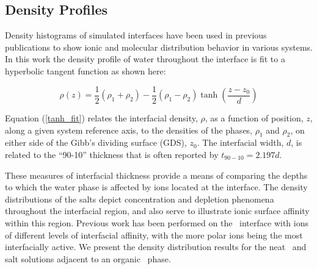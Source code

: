 \subsection{Density Profiles}

Density histograms of simulated interfaces have been used in previous publications to show ionic and molecular distribution behavior in various systems.\cite{Chang1995,Eggimann2008,Du2008,Wick2006c,Petersen2005a,Hore2008,Walker2006b,Walker2007b} In this work the density profile of water throughout the interface is fit to a hyperbolic tangent function\cite{Wick2006c,MATSUMOTO1988} as shown here:

\begin{equation}\label{tanh_fit}
	\rho(z) = \frac12(\rho_1+\rho_2) - \frac12\left(\rho_1-\rho_2\right)\tanh\left(\frac{z-z_0}{d}\right)
\end{equation}

Equation (\ref{tanh_fit}) relates the interfacial density, $\rho$, as a function of position, $z$, along a given system reference axis, to the densities of the phases, $\rho_1$ and $\rho_2$, on either side of the Gibb's dividing surface (GDS), $z_0$. The interfacial width, $d$, is related to the ``90-10'' thickness that is often reported by $t_{90-10} = 2.197d$.

These measures of interfacial thickness provide a means of comparing the depths to which the water phase is affected by ions located at the interface. The density distributions of the salts depict concentration and depletion phenomena throughout the interfacial region, and also serve to illustrate ionic surface affinity within this region. Previous work has been performed on the \airwat~interface with ions of different levels of interfacial affinity, with the more polar ions being the most interfacially active.\cite{Luo2006,Petersen2006,Petersen2005a,Allen2009,Hofft2006,Beattie2005,Bian2009,Dang2004b} We present the density distribution results for the neat \ctcwat~and salt solutions adjacent to an organic \ctc~phase. %



